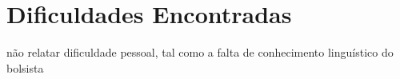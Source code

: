 \section{Dificuldades Encontradas}
\label{sec:dificuldades}

não relatar dificuldade pessoal, tal como a falta de conhecimento linguístico do bolsista
